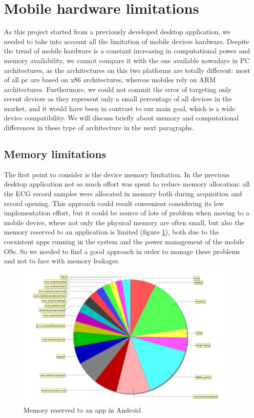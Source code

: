 \section{Mobile hardware limitations}
As this project started from a previously developed desktop application, we needed to take into account all the limitation of mobile devices hardware. Despite the trend of mobile hardware is a constant increasing in computational power and memory availability, we cannot compare it with the one available nowadays in PC architectures, as the architectures on this two platforms are totally different: most of all pc are based on x86 architectures, whereas mobiles rely on ARM architectures. Furthermore, we could not commit the error of targeting only recent devices as they represent only a small percentage of all devices in the market, and it would have been in contrast to our main goal, which is a wide device compatibility.  We will discuss briefly about memory and computational differences in these type of architecture in the next paragraphs.

\subsection{Memory limitations}
The first point to consider is the device memory limitation. In the previous desktop application not so much effort was spent to reduce memory allocation: all the ECG record samples were allocated in memory both during acquisition and record opening. This approach could result convenient considering its low implementation effort, but it could be source of lots of problem when moving to a mobile device, where not only the physical memory are often small, but also the memory reserved to an application is limited (figure \ref{fig6.4}), both due to the coexistent apps running in the system and the power management of the mobile OSs. So we needed to find a good approach in order to manage these problems and not to face with memory leakages.
\begin{figure}[ht!]
	\centering
	\includegraphics[width=120mm]{figures/ch6/4.png}
	\caption{Memory reserved to an app in Android.}
	\label{fig6.4}
\end{figure}

